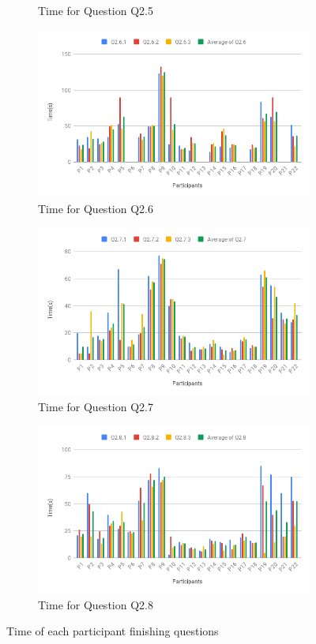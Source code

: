 \begin{figure}[h]
\begin{subfigure}[b]{0.48\textwidth}
		\caption{Time for Question Q2.5}
	\end{subfigure}
	\begin{subfigure}[b]{0.48\textwidth}
		\centering
		\includegraphics[width=\textwidth]{pictures/q26}
		\caption{Time for Question Q2.6}
	\end{subfigure}
	\begin{subfigure}[b]{0.48\textwidth}
		\centering
		\includegraphics[width=\textwidth]{pictures/q27}
		\caption{Time for Question Q2.7}
	\end{subfigure}
	\begin{subfigure}[b]{0.48\textwidth}
	\centering
	\includegraphics[width=\textwidth]{pictures/q28}
	\caption{Time for Question Q2.8}
\end{subfigure}
	\caption{Time of each participant finishing questions}
	\label{fig:statics2}
\end{figure}

